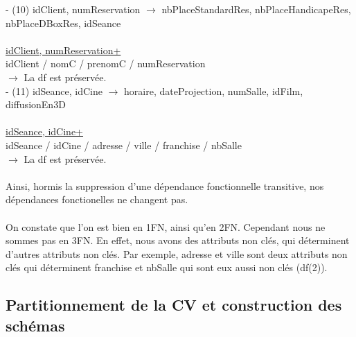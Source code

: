 \documentclass[a4paper,sffamily,12pt]{article}
\begin{document}
				\noindent - (10) idClient, numReservation $\rightarrow$ nbPlaceStandardRes, nbPlaceHandicapeRes, nbPlaceDBoxRes, idSeance \\
					\\
					\underline{idClient, numReservation+} \\
					idClient / nomC / prenomC / numReservation \\									
				$\rightarrow$ La df est préservée. \\		

				\noindent - (11) idSeance, idCine $\rightarrow$ horaire, dateProjection, numSalle, idFilm, diffusionEn3D \\
					\\
					\underline{idSeance, idCine+} \\
					idSeance / idCine / adresse / ville / franchise / nbSalle \\							
				$\rightarrow$ La df est préservée. \\							
				\\		
				
				\indent Ainsi, hormis la suppression d'une dépendance fonctionnelle transitive, nos dépendances fonctionelles ne changent pas. \\																
				\\
				\indent On constate que l'on est bien en 1FN, ainsi qu'en 2FN. Cependant nous ne sommes pas en 3FN. En effet, nous avons des attributs non clés, qui déterminent d'autres attributs non clés. Par exemple, adresse et ville sont deux attributs non clés qui déterminent franchise et nbSalle qui sont eux aussi non clés (df(2)). \\
				
				\vspace{0.5cm}
													
			\subsection{Partitionnement de la CV et construction des schémas} 	
			
				\vspace{0.5cm}
			
\end{document}
